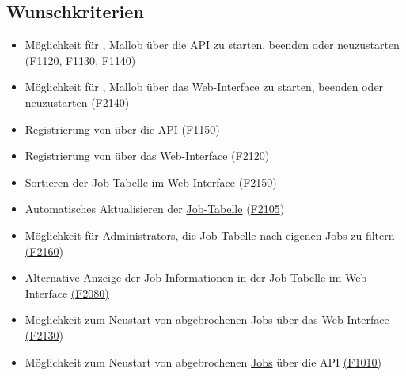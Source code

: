         
\subsection{Wunschkriterien}
    \begin{itemize}[noitemsep]
        \item Möglichkeit für , \gls{Mallob} über die \gls{API} zu starten, beenden oder neuzustarten  (\hyperref[FA:API:Starten von Mallob]{F1120}, \hyperref[FA:API:Stoppen von Mallob]{F1130}, \hyperref[FA:API:Neustart von Mallob]{F1140})
        \item Möglichkeit für , \gls{Mallob} über das \gls{Web-Interface} zu starten, beenden oder neuzustarten  \hyperref[FA:Web-Interface:Verwalten von Malllob]{(F2140)}
        \item Registrierung von  über die \gls{API} \hyperref[FA:API:Registrierung von Nutzern]{(F1150)}
        \item Registrierung von  über das \gls{Web-Interface} \hyperref[FA:Web-Interface:Registrierung von Nutzern]{(F2120)}
        \item Sortieren der \hyperref[pages:job-table]{Job-Tabelle} im \gls{Web-Interface} \hyperref[FA:Web-Interface:Sortieren der Tabelle]{(F2150)}
        \item Automatisches Aktualisieren der \hyperref[pages:job-table]{Job-Tabelle} (\hyperref[FA:Web-Interface:Aktualisieren]{F2105})
        \item Möglichkeit für \glspl{Administrator}, die \hyperref[pages:job-table]{Job-Tabelle} nach eigenen \hyperref[B:Jobs]{Jobs} zu filtern \hyperref[FA:Web-Interface:Filtern für Admins]{(F2160)}
        \item \hyperref[pages:job-table-alt]{Alternative Anzeige} der \hyperref[B:Job-Informationen]{Job-Informationen} in der Job-Tabelle im \gls{Web-Interface} \hyperref[FA:Web-Interface:Einsehen von Job-Informationen]{(F2080)}
        \item Möglichkeit zum Neustart von abgebrochenen \hyperref[B:Jobs]{Jobs} über das \gls{Web-Interface} \hyperref[FA:Web-Interface:Neustart]{(F2130)}
        \item Möglichkeit zum Neustart von abgebrochenen \hyperref[B:Jobs]{Jobs} über die \gls{API} \hyperref[FA:API:Einreichen von Jobs]{(F1010)}

\end{itemize}
